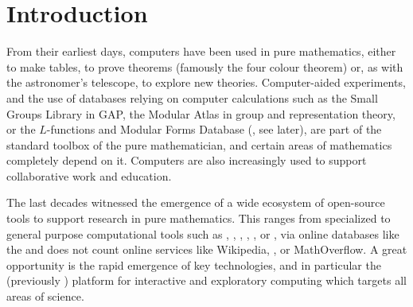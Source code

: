 \section{Introduction}


From their earliest days, computers have been used in pure mathematics, either to make
tables, to prove theorems (famously the four colour theorem) or, as with the astronomer's
telescope, to explore new theories. Computer-aided experiments, and the use of databases
relying on computer calculations such as the Small Groups Library in GAP, the Modular
Atlas in group and representation theory, or the $L$-functions and Modular Forms Database (\LMFDB, see later), are part of the standard
toolbox of the pure mathematician, and certain areas of mathematics completely depend on
it. Computers are also increasingly used to support collaborative work and education.

The last decades witnessed the emergence of a wide ecosystem of open-source tools to
support research in pure mathematics. This ranges from specialized to general purpose
computational tools such as \GAP, \PariGP, \Linbox, \MPIR, \Sage, or \Singular, via online
databases like the \LMFDB and does not count online services like Wikipedia,
\Arxiv, or MathOverflow. A great opportunity is the rapid emergence of key technologies,
and in particular the \Jupyter (previously \IPython) platform for interactive and
exploratory computing which targets all areas of science.

